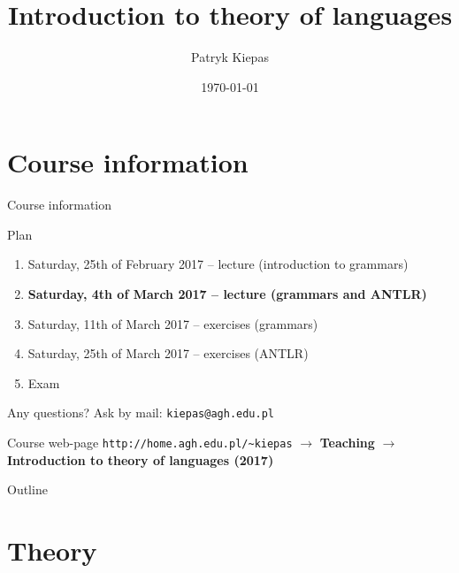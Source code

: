 \documentclass{beamer}
\title[Theory of languages]{Introduction to theory of languages}
\author{Patryk Kiepas}
\institute{MINES ParisTech \& AGH}
\date{\today}
\begin{document}

\begin{frame}
  \titlepage
\end{frame}

\section{Course information}


\begin{frame}[fragile]{Course information}

\begin{block}{Plan}
	\begin{enumerate}
		\item Saturday, 25th of February 2017 -- lecture (introduction to grammars)
		\item \textbf{Saturday, 4th of March 2017 -- lecture (grammars and ANTLR)}
		\item Saturday, 11th of March 2017 -- exercises (grammars)
		\item Saturday, 25th of March 2017 -- exercises (ANTLR)
		\item Exam
	\end{enumerate}
\end{block}

\begin{alertblock}{Any questions?}
	Ask by mail: \verb|kiepas@agh.edu.pl|
\end{alertblock}

\begin{alertblock}{Course web-page}
	\verb|http://home.agh.edu.pl/~kiepas| $\rightarrow$ \textbf{Teaching} $\rightarrow$ \textbf{Introduction to theory of languages (2017)}
\end{alertblock}

\end{frame}


\begin{frame}{Outline}
	\tableofcontents
\end{frame}

\section{Theory}
\end{document}
